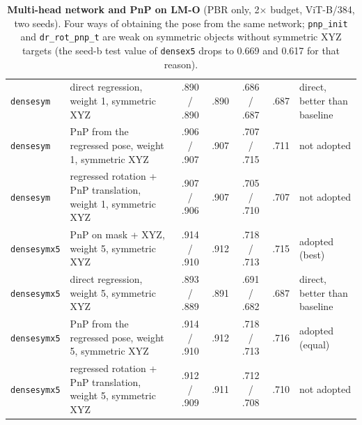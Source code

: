 \begin{table}[t]
\begin{tabular}{@{}llccccl@{}}
    \texttt{densesym} & direct regression, weight 1, symmetric XYZ & .890 / .890 & .890 & .686 / .687 & .687 & direct, better than baseline \\
    \texttt{densesym} & PnP from the regressed pose, weight 1, symmetric XYZ & .906 / .907 & .907 & .707 / .715 & .711 & not adopted \\
    \texttt{densesym} & regressed rotation + PnP translation, weight 1, symmetric XYZ & .907 / .906 & .907 & .705 / .710 & .707 & not adopted \\
    \midrule
    \texttt{densesymx5} & PnP on mask + XYZ, weight 5, symmetric XYZ & .914 / .910 & .912 & .718 / .713 & .715 & adopted (best) \\
    \texttt{densesymx5} & direct regression, weight 5, symmetric XYZ & .893 / .889 & .891 & .691 / .682 & .687 & direct, better than baseline \\
    \texttt{densesymx5} & PnP from the regressed pose, weight 5, symmetric XYZ & .914 / .910 & .912 & .718 / .713 & .716 & adopted (equal) \\
    \texttt{densesymx5} & regressed rotation + PnP translation, weight 5, symmetric XYZ & .912 / .909 & .911 & .712 / .708 & .710 & not adopted \\
    \bottomrule
  \end{tabular}
  \caption{\textbf{Multi-head network and PnP on LM-O} (PBR only, 2$\times$ budget, ViT-B/384, two seeds). Four ways of obtaining the pose from the same network; \texttt{pnp\_init} and \texttt{dr\_rot\_pnp\_t} are weak on symmetric objects without symmetric XYZ targets (the seed-b test value of \texttt{densex5} drops to 0.669 and 0.617 for that reason).}
  \label{tab:cat_dense}
\end{table}

